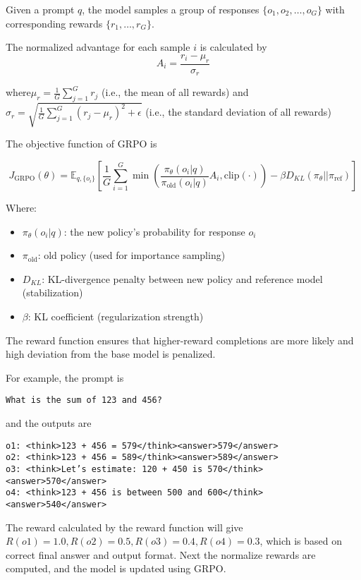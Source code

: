 \documentclass{article} %
\begin{document}
Given a prompt \( q \), the model samples a group of responses \(\{o_1, o_2, \dots, o_G\}\) with corresponding rewards \(\{r_1, \dots, r_G\}\).

The normalized advantage for each sample \(i\) is calculated by
\[A_i = \frac{r_i - \mu_r}{\sigma_r}\]

where\(\mu_r = \frac{1}{G} \sum_{j=1}^G r_j\) (i.e., the mean of all rewards) and \(\sigma_r = \sqrt{\frac{1}{G} \sum_{j=1}^G (r_j - \mu_r)^2 + \epsilon}\) (i.e., the standard deviation of all rewards)

The objective function of GRPO is

\[J_{\text{GRPO}}(\theta) = \mathbb{E}_{q,\{o_i\}} \left[ \frac{1}{G} \sum_{i=1}^G \min \left( \frac{\pi_\theta(o_i|q)}{\pi_{\text{old}}(o_i|q)} A_i, \text{clip}(\cdot) \right) - \beta D_{KL}(\pi_\theta||\pi_{\text{ref}}) \right]\]

Where:

\begin{itemize}
    \item \(\pi_\theta(o_i|q)\): the new policy's probability for response \(o_i\)
    
    \item \(\pi_{\text{old}}\): old policy (used for importance sampling)
    
    \item \(D_{KL}\): KL-divergence penalty between new policy and reference model (stabilization)
    
    \item \(\beta\): KL coefficient (regularization strength)
\end{itemize}
The reward function ensures that higher-reward completions are more likely and high deviation from the base model is penalized.

For example, the prompt is
\centerline \texttt{What is the sum of 123 and 456?}
and the outputs are 
\begin{center}
    \texttt{o1: <think>123 + 456 = 579</think><answer>579</answer> \\
o2: <think>123 + 456 = 589</think><answer>589</answer> \\
o3: <think>Let’s estimate: 120 + 450 is 570</think><answer>570</answer> \\
o4: <think>123 + 456 is between 500 and 600</think><answer>540</answer>
}
\end{center}
The reward calculated by the reward function will give $R(o1) = 1.0, R(o2) = 0.5, R(o3) = 0.4, R(o4) = 0.3$, which is based on correct final answer and output format. Next the normalize rewards are computed, and the model is updated using GRPO.
\end{document}
